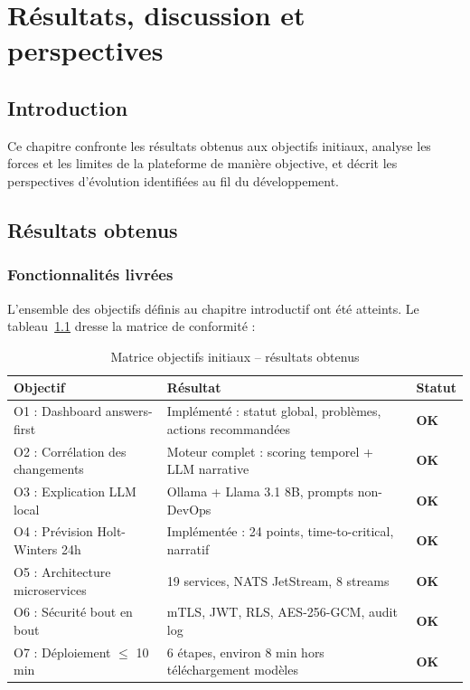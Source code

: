 \chapter{Résultats, discussion et perspectives}

\section*{Introduction}

Ce chapitre confronte les résultats obtenus aux objectifs initiaux, analyse
les forces et les limites de la plateforme de manière objective, et décrit
les perspectives d'évolution identifiées au fil du développement.

\section{Résultats obtenus}

\subsection{Fonctionnalités livrées}

L'ensemble des objectifs définis au chapitre introductif ont été atteints.
Le tableau~\ref{tab:obj-results} dresse la matrice de conformité :

\begin{table}[H]
\centering
\caption{Matrice objectifs initiaux -- résultats obtenus}
\label{tab:obj-results}
\begin{tabularx}{\textwidth}{lXl}
\toprule
\textbf{Objectif} & \textbf{Résultat} & \textbf{Statut} \\
\midrule
O1 : Dashboard answers-first
  & Implémenté : statut global, problèmes, actions recommandées
  & \textcolor{SuccessGreen}{\textbf{OK}} \\
O2 : Corrélation des changements
  & Moteur complet : scoring temporel + LLM narrative
  & \textcolor{SuccessGreen}{\textbf{OK}} \\
O3 : Explication LLM local
  & Ollama + Llama 3.1 8B, prompts non-DevOps
  & \textcolor{SuccessGreen}{\textbf{OK}} \\
O4 : Prévision Holt-Winters 24h
  & Implémentée : 24 points, time-to-critical, narratif
  & \textcolor{SuccessGreen}{\textbf{OK}} \\
O5 : Architecture microservices
  & 19 services, NATS JetStream, 8 streams
  & \textcolor{SuccessGreen}{\textbf{OK}} \\
O6 : Sécurité bout en bout
  & mTLS, JWT, RLS, AES-256-GCM, audit log
  & \textcolor{SuccessGreen}{\textbf{OK}} \\
O7 : Déploiement $\leq$ 10 min
  & 6 étapes, environ 8 min hors téléchargement modèles
  & \textcolor{SuccessGreen}{\textbf{OK}} \\
\bottomrule
\end{tabularx}
\end{table}

